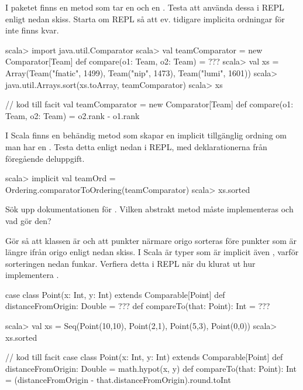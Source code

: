 \Subtask  I paketet  finns en metod  som tar en  och en . Testa att använda dessa i REPL enligt nedan skiss. Starta om REPL så att ev. tidigare implicita ordningar för  inte finns kvar.
\begin{REPL}
scala> import java.util.Comparator
scala> val teamComparator = new Comparator[Team]{
         def compare(o1: Team, o2: Team) = ???
       }
scala> val xs = 
         Array(Team("fnatic", 1499), Team("nip", 1473), Team("lumi", 1601))
scala> java.util.Arrays.sort(xs.toArray, teamComparator)
scala> xs
\end{REPL}
\begin{Code}
// kod till facit
val teamComparator = new Comparator[Team]{
  def compare(o1: Team, o2: Team) = o2.rank - o1.rank
}
\end{Code}

\Subtask I Scala finns en behändig metod  som skapar en implicit tillgänglig ordning om man har en . Testa detta enligt nedan i REPL, med deklarationerna från föregående deluppgift.
\begin{REPL}
scala> implicit val teamOrd = Ordering.comparatorToOrdering(teamComparator)
scala> xs.sorted
\end{REPL}



\Subtask\Pen Sök upp dokumentationen för . Vilken abstrakt metod måste implementeras och vad gör den? 

\Subtask Gör så att klassen  är  och att punkter närmare origo sorteras före punkter som är längre ifrån origo enligt nedan skiss. I Scala är typer som är  implicit även , varför sorteringen nedan funkar. Verfiera detta i REPL när du klurat ut hur implementera . 

\begin{Code}
case class Point(x: Int, y: Int) extends Comparable[Point] {
  def distanceFromOrigin: Double = ???
  def compareTo(that: Point): Int = ???
}
\end{Code}
\begin{REPL}
scala> val xs = Seq(Point(10,10), Point(2,1), Point(5,3), Point(0,0))
scala> xs.sorted
\end{REPL}
\begin{Code}
// kod till facit
case class Point(x: Int, y: Int) extends Comparable[Point] {
  def distanceFromOrigin: Double = math.hypot(x, y)
  def compareTo(that: Point): Int = 
    (distanceFromOrigin - that.distanceFromOrigin).round.toInt
}
\end{Code}


